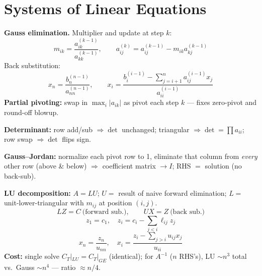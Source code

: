 \section{Systems of Linear Equations}

\begin{formulabox}
\textbf{Gauss elimination.} Multiplier and update at step $k$:
\[
m_{ik} = \frac{a_{ik}^{(k-1)}}{a_{kk}^{(k-1)}}, \qquad a_{ij}^{(k)} = a_{ij}^{(k-1)} - m_{ik}a_{kj}^{(k-1)}
\]
Back substitution:
\[
x_n = \frac{b_n^{(n-1)}}{a_{nn}^{(n-1)}}, \qquad x_i = \frac{b_i^{(i-1)} - \sum_{j=i+1}^n a_{ij}^{(i-1)}x_j}{a_{ii}^{(i-1)}}
\]
\textbf{Partial pivoting:} swap in $\max_i|a_{ik}|$ as pivot each step $k$ — fixes zero-pivot and round-off blowup.

\textbf{Determinant:} row add/sub $\Rightarrow \det$ unchanged; triangular $\Rightarrow \det=\prod a_{ii}$; row swap $\Rightarrow \det$ flips sign.

\textbf{Gauss--Jordan:} normalize each pivot row to 1, eliminate that column from \emph{every} other row (above \& below) $\Rightarrow$ coefficient matrix $\to I$; RHS $=$ solution (no back-sub).

\textbf{LU decomposition:} $A=LU$; $U=$ result of naive forward elimination; $L=$ unit-lower-triangular with $m_{ij}$ at position $(i,j)$.
\[
LZ=C \ \text{(forward sub.)}, \qquad UX=Z \ \text{(back sub.)}
\]
\[
z_1=c_1,\quad z_i = c_i - \sum_{j<i}\ell_{ij}z_j
\]
\[
x_n=\frac{z_n}{u_{nn}}, \quad x_i = \frac{z_i-\sum_{j>i}u_{ij}x_j}{u_{ii}}
\]
\textbf{Cost:} single solve $C_T|_{LU}=C_T|_{GE}$ (identical); for $A^{-1}$ ($n$ RHS's), LU $\sim n^3$ total vs.\ Gauss $\sim n^4$ — ratio $\approx n/4$.
\end{formulabox}
